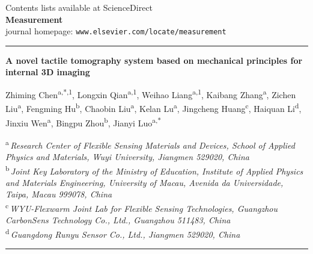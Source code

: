 \documentclass[11pt]{article}
\begin{document}
\noindent
{\footnotesize Contents lists available at ScienceDirect}\\[2pt]
{\Large\bfseries Measurement}\\[2pt]
{\footnotesize journal homepage: \texttt{www.elsevier.com/locate/measurement}}

\vspace{0.8em}
\hrule
\vspace{1em}

{\large\bfseries
A novel tactile tomography system based on mechanical principles
for internal 3D imaging\par}

\vspace{0.8em}

\noindent
Zhiming Chen\textsuperscript{a,*,1},
Longxin Qian\textsuperscript{a,1},
Weihao Liang\textsuperscript{a,1},
Kaibang Zhang\textsuperscript{a},
Zichen Liu\textsuperscript{a},
Fengming Hu\textsuperscript{b},
Chaobin Liu\textsuperscript{a},
Kelan Lu\textsuperscript{a},
Jingcheng Huang\textsuperscript{c},
Haiquan Li\textsuperscript{d},
Jinxiu Wen\textsuperscript{a},
Bingpu Zhou\textsuperscript{b},
Jianyi Luo\textsuperscript{a,*}

\vspace{0.5em}

\noindent
{\footnotesize
\textsuperscript{a}\,\emph{Research Center of Flexible Sensing
Materials and Devices, School of Applied Physics and Materials,
Wuyi University, Jiangmen 529020, China}\\[2pt]
\textsuperscript{b}\,\emph{Joint Key Laboratory of the Ministry of
Education, Institute of Applied Physics and Materials Engineering,
University of Macau, Avenida da Universidade, Taipa, Macau
999078, China}\\[2pt]
\textsuperscript{c}\,\emph{WYU-Flexwarm Joint Lab for Flexible
Sensing Technologies, Guangzhou CarbonSens Technology Co., Ltd.,
Guangzhou 511483, China}\\[2pt]
\textsuperscript{d}\,\emph{Guangdong Runyu Sensor Co., Ltd.,
Jiangmen 529020, China}\par}

\vspace{1em}
\hrule
\vspace{1em}
\end{document}
